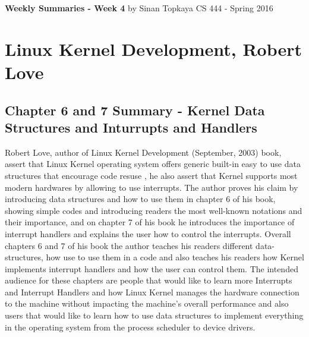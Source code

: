 \documentclass[letterpaper,10pt,draftclsnofoot,onecolumn]{IEEEtran}
\begin{document}
\begin{titlepage}
	
	\begin{center}
	\bigbreak
	\textbf{Weekly Summaries - Week 4}
	\bigbreak
	by Sinan Topkaya
	\smallbreak
	CS 444 - Spring 2016
	\end{center}
\end{titlepage}
	
\section*{Linux Kernel Development, Robert Love}
\subsection*{Chapter 6 and 7 Summary - Kernel Data Structures and Inturrupts and Handlers}

Robert Love, author of Linux Kernel Development (September, 2003) book, assert that Linux Kernel operating system offers generic built-in easy to use data structures that encourage code resuse , he also assert that Kernel supports most modern hardwares by allowing to use interrupts. The author proves his claim by introducing data structures and how to use them in chapter 6 of his book, showing simple codes and introducing readers the most well-known notations and their importance, and on chapter 7 of his book he introduces the importance of interrupt handlers and explains the user how to control the interrupts. Overall chapters 6 and 7 of his book the author teaches his readers different data-structures, how use to use them in a code and also teaches his readers how Kernel implements interrupt handlers and how the user can control them. The intended audience for these chapters are people that would like to learn more Interrupts and Interrupt Handlers and how Linux Kernel manages the hardware connection to the machine without impacting the machine’s overall performance and also users that would like to learn how to use data structures to implement everything in the operating system from the process scheduler to device drivers.
\end{document}

